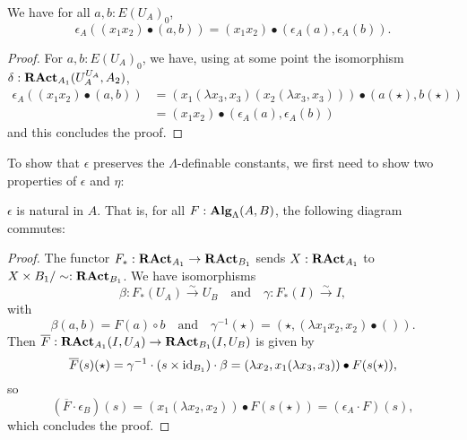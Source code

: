 \begin{lemma}
  We have for all $ a, b: E(U_A)_0 $,
  \[ \epsilon_A((x_1 x_2) \bullet (a, b)) = (x_1 x_2) \bullet (\epsilon_A(a), \epsilon_A(b)). \]
\end{lemma}
\begin{proof}
  For $ a, b: E(U_A)_0 $, we have, using at some point the isomorphism $ \delta: \mathbf{RAct}_{A_1}(U_A^{U_A}, A_2) $,
  \begin{align*}
    \epsilon_A((x_1 x_2) \bullet (a, b)) &= (x_1 (\lambda x_3, x_3) (x_2 (\lambda x_3, x_3))) \bullet (a(\star), b(\star))\\
    &= (x_1 x_2) \bullet (\epsilon_A(a), \epsilon_A(b))
  \end{align*}
  and this concludes the proof.
\end{proof}

To show that $ \epsilon $ preserves the $ \Lambda $-definable constants, we first need to show two properties of $ \epsilon $ and $ \eta $:
\begin{lemma}\label{lem:counit-natural}
  $ \epsilon $ is natural in $ A $. That is, for all $ F: \mathbf{Alg}_{\Lambda}(A, B) $, the following diagram commutes:
  \begin{center}
  \end{center}
\end{lemma}
\begin{proof}
  The functor $ F_* : \mathbf{RAct}_{A_1} \to \mathbf{RAct}_{B_1} $ sends $ X : \mathbf{RAct}_{A_1} $ to $ X \times B_1 / \sim : \mathbf{RAct}_{B_1} $. We have isomorphisms
  \[ \beta: F_*(U_A) \xrightarrow \sim U_B \quad \text{and} \quad \gamma: F_*(I) \xrightarrow \sim I, \]
  with
  \[ \beta(a, b) = F(a) \circ b \quad \text{and} \quad \gamma^{-1}(\star) = (\star, (\lambda x_1 x_2, x_2) \bullet ()). \]
  Then $ \overline F: \mathbf{RAct}_{A_1}(I, U_A) \to \mathbf{RAct}_{B_1}(I, U_B) $ is given by
  \[
    \overline F(s)(\star)
    = \gamma^{-1} \cdot (s \times \text{id}_{B_1}) \cdot \beta
    = (\lambda x_2, x_1 (\lambda x_3, x_3)) \bullet F(s(\star)),
  \]
  so
  \[
    (\overline F \cdot \epsilon_B)(s)
    = (x_1 (\lambda x_2, x_2)) \bullet F(s(\star))
    = (\epsilon_A \cdot F)(s),
  \]
  which concludes the proof.
\end{proof}

